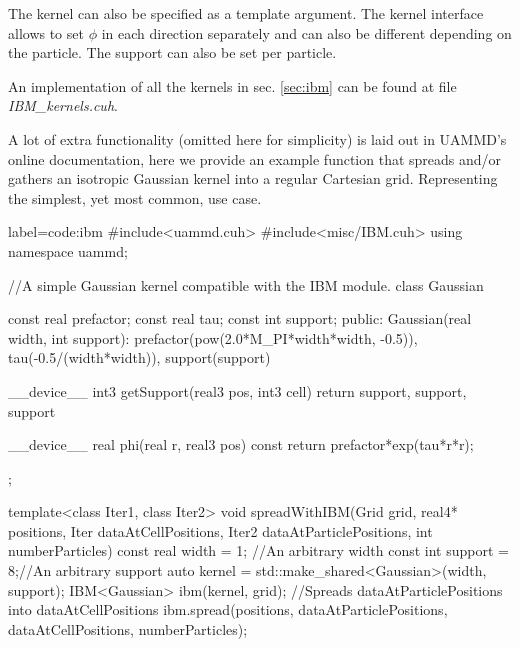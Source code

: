 \documentclass[twoside,openright,titlepage,numbers=noenddot,%
headinclude,footinclude,cleardoublepage=empty,abstract=on,
BCOR=5mm,fontsize=11pt, dvipsnames, paper=b5
]{scrreprt}
\newcommand{\uammd}{\gls{UAMMD}\xspace}
\begin{document}
The kernel can also be specified as a template argument. The kernel interface allows to set $\phi$ in each direction separately and can also be different depending on the particle. The support can also be set per particle.

An implementation of all the kernels in sec. \ref{sec:ibm} can be found at file \emph{IBM\_kernels.cuh}.

A lot of extra functionality (omitted here for simplicity) is laid out in \uammd's online documentation, here we provide an example function that spreads and/or gathers an isotropic Gaussian kernel into a regular Cartesian grid. Representing the simplest, yet most common, use case.

\begin{code2}  {label=code:ibm}
#include<uammd.cuh>
#include<misc/IBM.cuh>
using namespace uammd;

//A simple Gaussian kernel compatible with the IBM module.
class Gaussian{
  const real prefactor;
  const real tau;
  const int support;
public:
  Gaussian(real width, int support):
    prefactor(pow(2.0*M_PI*width*width, -0.5)),
    tau(-0.5/(width*width)),
    support(support){}

  __device__ int3 getSupport(real3 pos, int3 cell){
    return {support, support, support}
  }

  __device__ real phi(real r, real3 pos) const{
    return prefactor*exp(tau*r*r);
  }
};

template<class Iter1, class Iter2>
void spreadWithIBM(Grid grid, real4* positions,
                   Iter dataAtCellPositions,
                   Iter2 dataAtParticlePositions,
                   int numberParticles){
  const real width = 1; //An arbitrary width
  const int support = 8;//An arbitrary support
  auto kernel = std::make_shared<Gaussian>(width, support);
  IBM<Gaussian> ibm(kernel, grid);
  //Spreads dataAtParticlePositions into dataAtCellPositions
  ibm.spread(positions, dataAtParticlePositions, dataAtCellPositions, numberParticles);
}


\end{code2}
\end{document}
